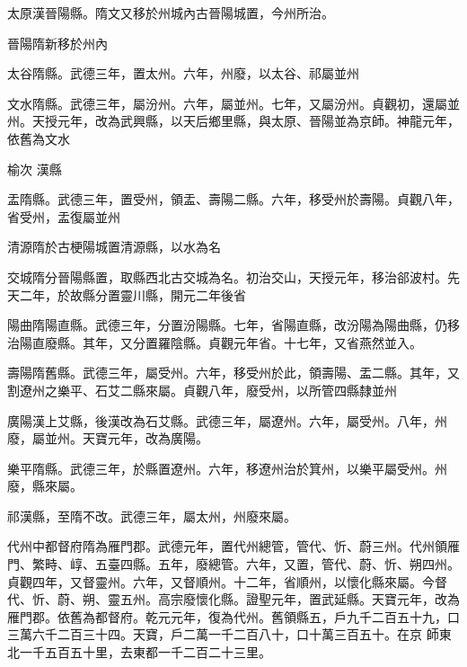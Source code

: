 \begin{pinyinscope}
 太原漢晉陽縣。隋文又移於州城內古晉陽城置，今州所治。



 晉陽隋新移於州內



 太谷隋縣。武德三年，置太州。六年，州廢，以太谷、祁屬並州



 文水隋縣。武德三年，屬汾州。六年，屬並州。七年，又屬汾州。貞觀初，還屬並州。天授元年，改為武興縣，以天后鄉里縣，與太原、晉陽並為京師。神龍元年，依舊為文水



 榆次
 漢縣



 盂隋縣。武德三年，置受州，領盂、壽陽二縣。六年，移受州於壽陽。貞觀八年，省受州，盂復屬並州



 清源隋於古梗陽城置清源縣，以水為名



 交城隋分晉陽縣置，取縣西北古交城為名。初治交山，天授元年，移治郤波村。先天二年，於故縣分置靈川縣，開元二年後省



 陽曲隋陽直縣。武德三年，分置汾陽縣。七年，省陽直縣，改汾陽為陽曲縣，仍移治陽直廢縣。其年，又分置羅陰縣。貞觀元年省。十七年，又省燕然並入。



 壽陽隋舊縣。武德三年，屬受州。六年，移受州於此，領壽陽、盂二縣。其年，又割遼州之樂平、石艾二縣來屬。貞觀八年，廢受州，以所管四縣隸並州



 廣陽漢上艾縣，後漢改為石艾縣。武德三年，屬遼州。六年，屬受州。八年，州廢，屬並州。天寶元年，改為廣陽。



 樂平隋縣。武德三年，於縣置遼州。六年，移遼州治於箕州，以樂平屬受州。州廢，縣來屬。



 祁漢縣，至隋不改。武德三年，屬太州，州廢來屬。



 代州中都督府隋為雁門郡。武德元年，置代州總管，管代、忻、蔚三州。代州領雁門、繁畤、崞、五臺四縣。五年，廢總管。六年，又置，管代、蔚、忻、朔四州。貞觀四年，又督靈州。六年，又督順州。十二年，省順州，以懷化縣來屬。今督代、忻、蔚、朔、靈五州。高宗廢懷化縣。證聖元年，置武延縣。天寶元年，改為雁門郡。依舊為都督府。乾元元年，復為代州。舊領縣五，戶九千二百五十九，口三萬六千二百三十四。天寶，戶二萬一千二百八十，口十萬三百五十。在京
 師東北一千五百五十里，去東都一千二百二十三里。




\end{pinyinscope}
